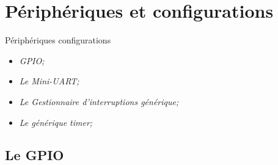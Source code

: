 \documentclass[french]{beamer}
\begin{document}
\section{Périphériques et configurations}
\begin{frame}
	\transsplitverticalout
\end{frame}

\begin{frame}{Périphériques  configurations}
	\transsplitverticalout
	\begin{beamerboxesrounded}[scheme=blocgrisclair]{}
		\begin{center}
			\begin{itemize}
				\color{nb}
				\large
				\item<1-> \textit{GPIO;}
				\item<2-> \textit{Le Mini-UART;}
				\item<3-> \textit{Le Gestionnaire d'interruptions générique;}
				\item<4-> \textit{Le générique timer;}
			\end{itemize}
		\end{center}
	\end{beamerboxesrounded}
\end{frame}

\subsection{Le GPIO}
\begin{frame}
	\transsplitverticalout
\end{frame}
\end{document}
